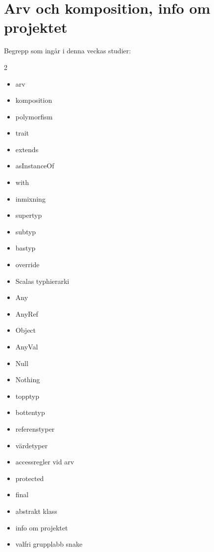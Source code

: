 \chapter{Arv och komposition, info om projektet}\label{chapter:W10}
Begrepp som ingår i denna veckas studier:
\begin{multicols}{2}\begin{itemize}[noitemsep,label={$\square$},leftmargin=*]
\item arv
\item komposition
\item polymorfism
\item trait
\item extends
\item asInstanceOf
\item with
\item inmixning
\item supertyp
\item subtyp
\item bastyp
\item override
\item Scalas typhierarki
\item Any
\item AnyRef
\item Object
\item AnyVal
\item Null
\item Nothing
\item topptyp
\item bottentyp
\item referenstyper
\item värdetyper
\item accessregler vid arv
\item protected
\item final
\item abstrakt klass
\item info om projektet
\item valfri grupplabb snake\end{itemize}\end{multicols}

